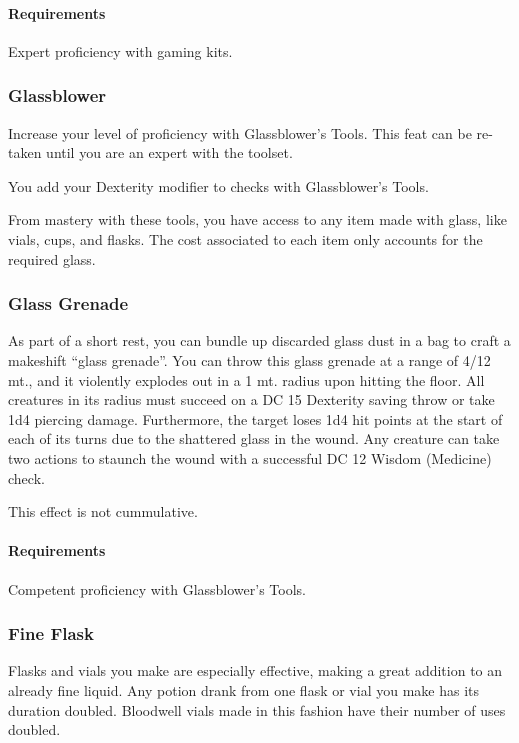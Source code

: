     \paragraph{Requirements} Expert proficiency with gaming kits.

\subsubsection{Glassblower} \label{feat::glassblower}
    Increase your level of proficiency with Glassblower's Tools.
    This feat can be re-taken until you are an expert with the toolset.

    You add your Dexterity modifier to checks with Glassblower's Tools.

    From mastery with these tools, you have access to any item made with glass, like vials, cups, and flasks.
    The cost associated to each item only accounts for the required glass.

\subsubsection{Glass Grenade} \label{feat::glassgrenade}
    As part of a short rest, you can bundle up discarded glass dust in a bag to craft a makeshift ``glass grenade''.
    You can throw this glass grenade at a range of 4/12 mt., and it violently explodes out in a 1 mt. radius upon hitting the floor.
    All creatures in its radius must succeed on a DC 15 Dexterity saving throw or take 1d4 piercing damage.
    Furthermore, the target loses 1d4 hit points at the start of each of its turns due to the shattered glass in the wound.
    Any creature can take two actions to staunch the wound with a successful DC 12 Wisdom (Medicine) check.

    This effect is not cummulative.
    \paragraph{Requirements} Competent proficiency with Glassblower's Tools.
\subsubsection{Fine Flask} \label{feat::fineflask}
    Flasks and vials you make are especially effective, making a great addition to an already fine liquid.
    Any potion drank from one flask or vial you make has its duration doubled.
    Bloodwell vials made in this fashion have their number of uses doubled.

